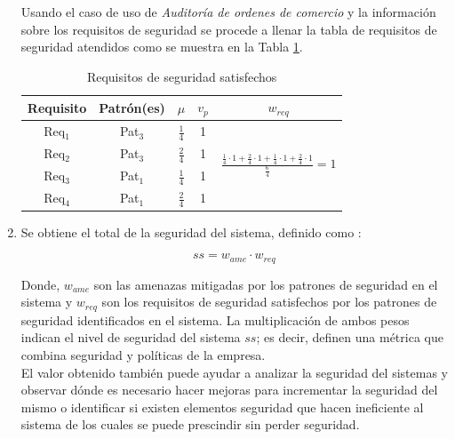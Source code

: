 \begin{enumerate}[label=Paso \arabic*:,leftmargin=*]
Usando el caso de uso de \textit{Auditoría de ordenes de comercio} y la información sobre los requisitos de seguridad se procede a llenar la tabla de requisitos de seguridad atendidos como se muestra en la Tabla \ref{eval_req}.

\begin{table}[!ht]
\caption{Requisitos de seguridad satisfechos}
\renewcommand{\arraystretch}{1.5}
\begin{center}
\scriptsize{
\begin{tabular}{ |c|c|c|c|c|}
\hline
	\cellcolor{lightgray}Requisito&\cellcolor{lightgray}Patrón(es)&\cellcolor{lightgray}$\mu$& \cellcolor{lightgray}$v_p$ & \cellcolor{lightgray}$w_{req}$ \\ \hline
	Req$_1$&Pat$_3$&$\frac{1}{4}$&1&\multirow{5}{*}{$\frac{\frac{1}{4}\cdot 1+\frac{2}{4}\cdot 1+\frac{1}{4}\cdot 1+\frac{2}{4}\cdot 1}{\frac{6}{4}}=1$}\\\cline{1-4}
	Req$_2$&Pat$_3$&$\frac{2}{4}$&1&\\\cline{1-4}
	Req$_3$&Pat$_1$&$\frac{1}{4}$&1&\\\cline{1-4}
	Req$_4$&Pat$_1$&$\frac{2}{4}$&1&\\\hline
\end{tabular}
}
\end{center}
\label{eval_req}
\end{table}

\item Se obtiene el total de la seguridad del sistema, definido como :

\begin{equation*}
	ss = w_{ame} \cdot w_{req}
\end{equation*}

Donde, $w_{ame}$ son las amenazas mitigadas por los patrones de seguridad en el sistema y $w_{req}$ son los requisitos de seguridad satisfechos por los patrones de seguridad identificados en el sistema. La multiplicación de ambos pesos indican el nivel de seguridad del sistema $ss$; es decir, definen una métrica que combina seguridad y políticas de la empresa.\\

El valor obtenido también puede ayudar a analizar la seguridad del sistemas y observar dónde es necesario hacer mejoras para incrementar la seguridad del mismo o identificar si existen elementos seguridad que hacen ineficiente al sistema de los cuales se puede prescindir sin perder seguridad.  

\end{enumerate}

